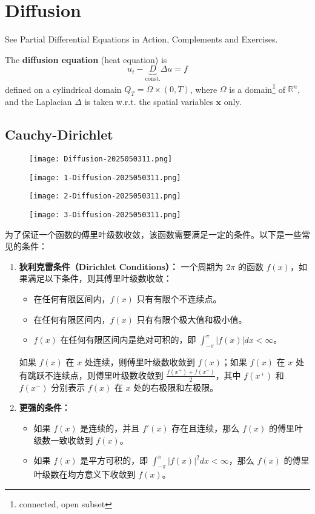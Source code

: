 \section{Diffusion}

See Partial Differential Equations in Action, Complements and Exercises.

The \textbf{diffusion equation} (heat equation) is
\[
u_{t}-\underbrace{ D }_{ \text{const.} }\Delta u=f
\]
defined on a cylindrical domain $Q_{T}=\Omega \times(0,T)$, where $\Omega$ is a domain\footnote{connected, open subset} of $\mathbb{R}^{n}$, and the Laplacian $\Delta$ is taken w.r.t. the spatial variables $\mathbf{x}$ only.

\subsection{Cauchy-Dirichlet}

\begin{figure}[H]
\centering
\texttt{[image: Diffusion-2025050311.png]}
\label{}
\end{figure}
\begin{figure}[H]
\centering
\texttt{[image: 1-Diffusion-2025050311.png]}
\label{}
\end{figure}
\begin{figure}[H]
\centering
\texttt{[image: 2-Diffusion-2025050311.png]}
\label{}
\end{figure}
\begin{figure}[H]
\centering
\texttt{[image: 3-Diffusion-2025050311.png]}
\label{}
\end{figure}

为了保证一个函数的傅里叶级数收敛，该函数需要满足一定的条件。以下是一些常见的条件：

\begin{enumerate}
	\item \textbf{狄利克雷条件（Dirichlet Conditions）：}
一个周期为 $2\pi$ 的函数 $f(x)$，如果满足以下条件，则其傅里叶级数收敛：
	\begin{itemize}
		\item 在任何有限区间内，$f(x)$ 只有有限个不连续点。
		\item 在任何有限区间内，$f(x)$ 只有有限个极大值和极小值。
		\item $f(x)$ 在任何有限区间内是绝对可积的，即 $\int_{-\pi}^{\pi} |f(x)| dx < \infty$。
	\end{itemize}
如果 $f(x)$ 在 $x$ 处连续，则傅里叶级数收敛到 $f(x)$；如果 $f(x)$ 在 $x$ 处有跳跃不连续点，则傅里叶级数收敛到 $\frac{f(x^+) + f(x^-)}{2}$，其中 $f(x^+)$ 和 $f(x^-)$ 分别表示 $f(x)$ 在 $x$ 处的右极限和左极限。
	\item \textbf{更强的条件：}
	\begin{itemize}
		\item 如果 $f(x)$ 是连续的，并且 $f'(x)$ 存在且连续，那么 $f(x)$ 的傅里叶级数一致收敛到 $f(x)$。
		\item 如果 $f(x)$ 是平方可积的，即 $\int_{-\pi}^{\pi} |f(x)|^2 dx < \infty$，那么 $f(x)$ 的傅里叶级数在均方意义下收敛到 $f(x)$。
	\end{itemize}
\end{enumerate}

